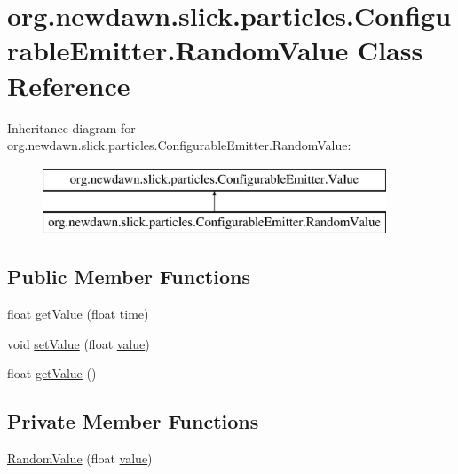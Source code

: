 \hypertarget{classorg_1_1newdawn_1_1slick_1_1particles_1_1_configurable_emitter_1_1_random_value}{}\section{org.\+newdawn.\+slick.\+particles.\+Configurable\+Emitter.\+Random\+Value Class Reference}
\label{classorg_1_1newdawn_1_1slick_1_1particles_1_1_configurable_emitter_1_1_random_value}
Inheritance diagram for org.\+newdawn.\+slick.\+particles.\+Configurable\+Emitter.\+Random\+Value\+:\begin{figure}[H]
\begin{center}
\leavevmode
\includegraphics[height=2.000000cm]{classorg_1_1newdawn_1_1slick_1_1particles_1_1_configurable_emitter_1_1_random_value}
\end{center}
\end{figure}
\subsection*{Public Member Functions}
\begin{DoxyCompactItemize}
\item 
float \mbox{\hyperlink{classorg_1_1newdawn_1_1slick_1_1particles_1_1_configurable_emitter_1_1_random_value_ae9dc013f90bbed1ed8d25830a1e91f1f}{get\+Value}} (float time)
\item 
void \mbox{\hyperlink{classorg_1_1newdawn_1_1slick_1_1particles_1_1_configurable_emitter_1_1_random_value_a3c86f6ea416b30a58d0b491e8ed68ca5}{set\+Value}} (float \mbox{\hyperlink{classorg_1_1newdawn_1_1slick_1_1particles_1_1_configurable_emitter_1_1_random_value_a79aeb62a3f0873cf7ca46240f9e37d09}{value}})
\item 
float \mbox{\hyperlink{classorg_1_1newdawn_1_1slick_1_1particles_1_1_configurable_emitter_1_1_random_value_a7f5c6159c75523c9f4e702504b609bf6}{get\+Value}} ()
\end{DoxyCompactItemize}
\subsection*{Private Member Functions}
\begin{DoxyCompactItemize}
\item 
\mbox{\hyperlink{classorg_1_1newdawn_1_1slick_1_1particles_1_1_configurable_emitter_1_1_random_value_a8294b0a87ef3fd63daf50ae941ceb20e}{Random\+Value}} (float \mbox{\hyperlink{classorg_1_1newdawn_1_1slick_1_1particles_1_1_configurable_emitter_1_1_random_value_a79aeb62a3f0873cf7ca46240f9e37d09}{value}})
\end{DoxyCompactItemize}
